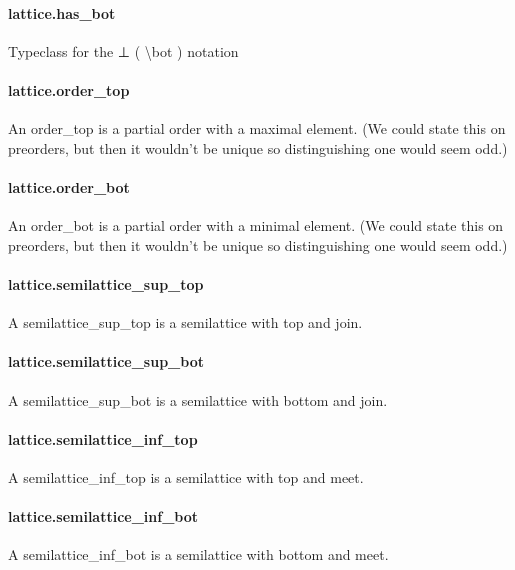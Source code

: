 \documentclass{article}
\begin{document}
\paragraph{lattice.has\_bot}
\par
Typeclass for the 
\colorbox[RGB]{253,246,227}{{{{\color[RGB]{101, 123, 131} ⊥ }}}} (
\colorbox[RGB]{253,246,227}{{{{\color[RGB]{101, 123, 131} \textbackslash{}bot }}}}) notation
\paragraph{lattice.order\_top}
\par
An 
\colorbox[RGB]{253,246,227}{{{{\color[RGB]{101, 123, 131} order\_top }}}} is a partial order with a maximal element.
(We could state this on preorders, but then it wouldn't be unique
so distinguishing one would seem odd.)
\paragraph{lattice.order\_bot}
\par
An 
\colorbox[RGB]{253,246,227}{{{{\color[RGB]{101, 123, 131} order\_bot }}}} is a partial order with a minimal element.
(We could state this on preorders, but then it wouldn't be unique
so distinguishing one would seem odd.)
\paragraph{lattice.semilattice\_sup\_top}
\par
A 
\colorbox[RGB]{253,246,227}{{{{\color[RGB]{101, 123, 131} semilattice\_sup\_top }}}} is a semilattice with top and join.
\paragraph{lattice.semilattice\_sup\_bot}
\par
A 
\colorbox[RGB]{253,246,227}{{{{\color[RGB]{101, 123, 131} semilattice\_sup\_bot }}}} is a semilattice with bottom and join.
\paragraph{lattice.semilattice\_inf\_top}
\par
A 
\colorbox[RGB]{253,246,227}{{{{\color[RGB]{101, 123, 131} semilattice\_inf\_top }}}} is a semilattice with top and meet.
\paragraph{lattice.semilattice\_inf\_bot}
\par
A 
\colorbox[RGB]{253,246,227}{{{{\color[RGB]{101, 123, 131} semilattice\_inf\_bot }}}} is a semilattice with bottom and meet.
\end{document}
